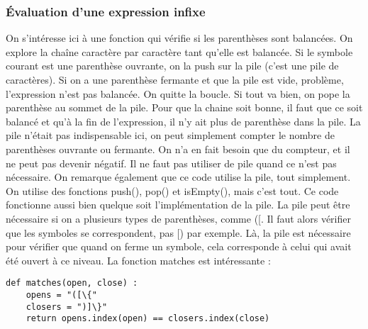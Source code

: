 \documentclass[10pt]{article}
\begin{document}
\subsubsection{Évaluation d'une expression infixe}
On s'intéresse ici à une fonction qui vérifie si les parenthèses sont balancées. On explore la chaîne caractère par caractère tant qu'elle est balancée. Si le symbole courant est une parenthèse ouvrante, on la push sur la pile (c'est une pile de caractères). Si on a une parenthèse fermante et que la pile est vide, problème, l'expression n'est pas balancée. On quitte la boucle. Si tout va bien, on pope la parenthèse au sommet de la pile. 
\newline \newline 
Pour que la chaine soit bonne, il faut que ce soit balancé et qu'à la fin de l'expression, il n'y ait plus de parenthèse dans la pile. 
\newline \newline 
La pile n'était pas indispensable ici, on peut simplement compter le nombre de parenthèses ouvrante ou fermante. On n'a en fait besoin que du compteur, et il ne peut pas devenir négatif. Il ne faut pas utiliser de pile quand ce n'est pas nécessaire. 
\newline \newline 
On remarque également que ce code utilise la pile, tout simplement. On utilise des fonctions push(), pop() et isEmpty(), mais c'est tout. Ce code fonctionne aussi bien quelque soit l'implémentation de la pile. 
\newline \newline 
La pile peut être nécessaire si on a plusieurs types de parenthèses, comme ([. Il faut alors vérifier que les symboles se correspondent, pas [) par exemple. Là, la pile est nécessaire pour vérifier que quand on ferme un symbole, cela corresponde à celui qui avait été ouvert à ce niveau. 
\newline \newline 
La fonction matches est intéressante : 
\lstset{language=Python}
\lstset{basicstyle=\footnotesize}
\begin{lstlisting}
def matches(open, close) : 
	opens = "([\{" 
	closers = ")]\}" 
	return opens.index(open) == closers.index(close)
\end{lstlisting}
\end{document}
